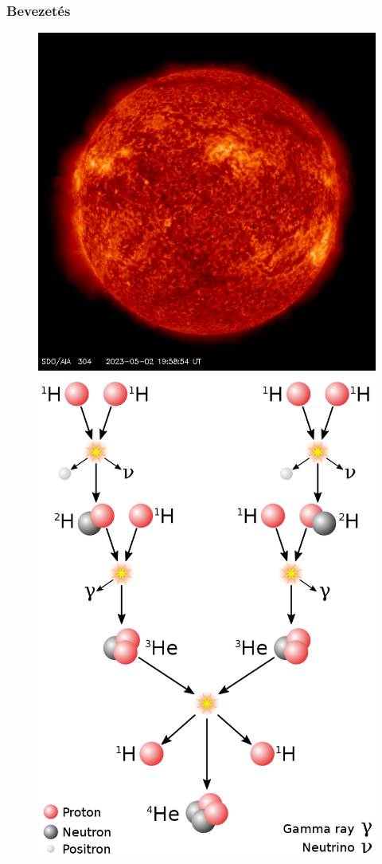 \documentclass{beamer}
\begin{document}
\begin{frame}
    \frametitle{Bevezetés}
    \begin{figure}
        \includegraphics[scale=0.30]{latest_512_0304.jpg}
        \includegraphics[scale=0.13]{800px-Fusion_in_the_Sun.svg.png}
    \end{figure} 
\end{frame}
\end{document}
